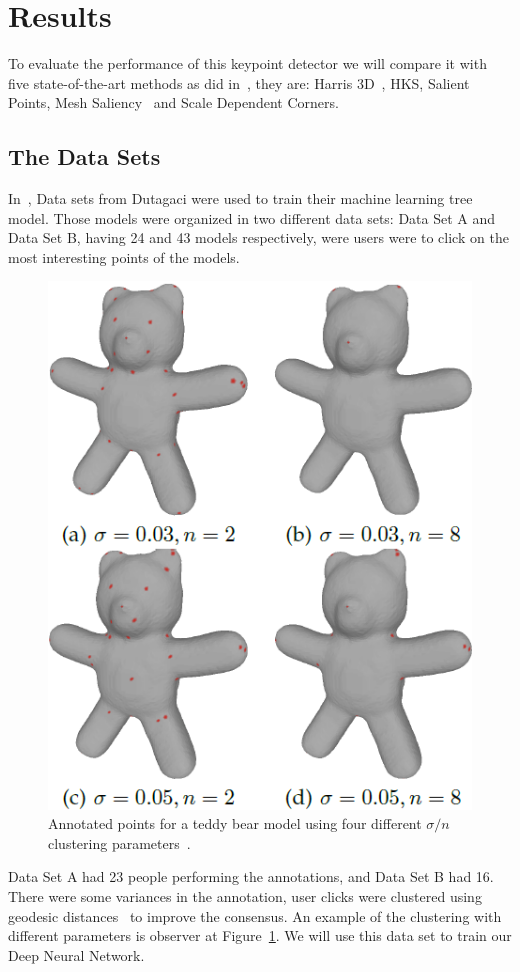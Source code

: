 \documentclass{comjnl}
\begin{document}
\section{Results} \label{Results}
To evaluate the performance of this keypoint detector we will compare it
with five state-of-the-art methods as did in~\cite{Lin2016}, they are:
Harris 3D~\cite{Sipiran2011}, HKS, Salient Points, Mesh Saliency~\cite{Lee2005}
and Scale Dependent Corners.

\subsection{The Data Sets}
In~\cite{Teran2014}, Data sets from Dutagaci were used to train their 
machine learning tree model. Those models were organized in two different
data sets: Data Set A and Data Set B, having 24 and 43 models respectively,
were users were to click on the most interesting points of the models.

\begin{figure}
\centering
\includegraphics[width=0.75\linewidth]{figures/ground_truth.png}
\caption{Annotated points for a teddy bear model using four different
$\sigma / n$ clustering parameters~\cite{Teran2014}.}
\label{fig:ground_truth_clustering}
\end{figure}

Data Set A had 23 people performing the annotations, and Data Set B had
16. There were some variances in the annotation, user clicks were clustered
using geodesic distances~\cite{surazhsky2005fast} to improve the consensus.
An example of the clustering with different parameters is observer at
Figure~\ref{fig:ground_truth_clustering}. We will use this data set to
train our Deep Neural Network.
\end{document}
